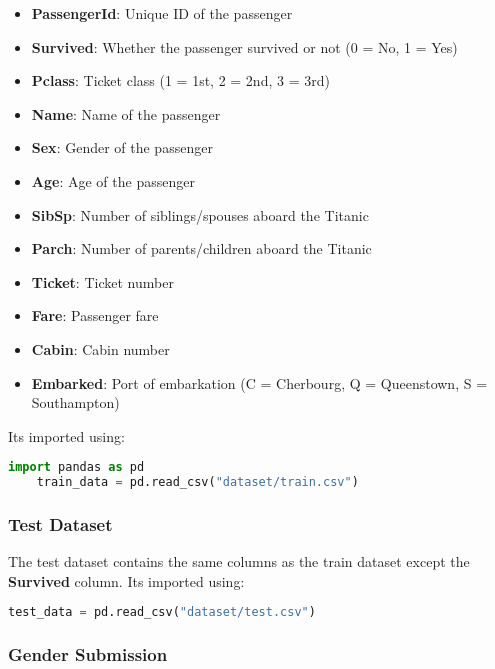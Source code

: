 \documentclass{exam}
\begin{document}
\begin{questions}
\begin{TheSolution}
        \begin{itemize}
            \item \textbf{PassengerId}: Unique ID of the passenger
            \item \textbf{Survived}: Whether the passenger survived or not (0 = No, 1 = Yes)
            \item \textbf{Pclass}: Ticket class (1 = 1st, 2 = 2nd, 3 = 3rd)
            \item \textbf{Name}: Name of the passenger
            \item \textbf{Sex}: Gender of the passenger
            \item \textbf{Age}: Age of the passenger
            \item \textbf{SibSp}: Number of siblings/spouses aboard the Titanic
            \item \textbf{Parch}: Number of parents/children aboard the Titanic
            \item \textbf{Ticket}: Ticket number
            \item \textbf{Fare}: Passenger fare
            \item \textbf{Cabin}: Cabin number
            \item \textbf{Embarked}: Port of embarkation (C = Cherbourg, Q = Queenstown, S = Southampton)
        \end{itemize}

        Its imported using:

        \begin{lstlisting}[language=Python]
    import pandas as pd
    train_data = pd.read_csv("dataset/train.csv")
        \end{lstlisting}

        \subsubsection{Test Dataset}

        The test dataset contains the same columns as the train dataset except the \textbf{Survived} column. Its imported using:

        \begin{lstlisting}[language=Python]
    test_data = pd.read_csv("dataset/test.csv")
        \end{lstlisting}

        \subsubsection{Gender Submission}


\end{TheSolution}
\end{questions}
\end{document}
